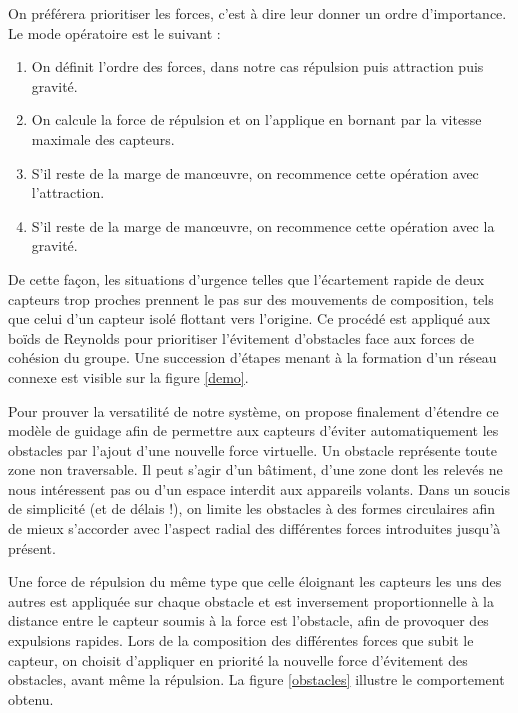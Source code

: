 \documentclass[10pt]{article}
\begin{document}
\begin{multicols}{2}
On préférera prioritiser les forces, c'est à dire leur donner un ordre
d'importance. Le mode opératoire est le suivant :

\begin{enumerate}
\item{On définit l'ordre des forces, dans notre cas répulsion puis
  attraction puis gravité.}
\item{On calcule la force de répulsion et on l'applique en bornant par
  la vitesse maximale des capteurs.}
\item{S'il reste de la marge de man\oe uvre, on recommence cette
  opération avec l'attraction.}
\item{S'il reste de la marge de man\oe uvre, on recommence cette
  opération avec la gravité.}
\end{enumerate}

De cette façon, les situations d'urgence telles que l'écartement
rapide de deux capteurs trop proches prennent le pas sur des
mouvements de composition, tels que celui d'un capteur isolé flottant
vers l'origine. Ce procédé est appliqué aux boïds de Reynolds pour
prioritiser l'évitement d'obstacles face aux forces de cohésion du
groupe. Une succession d'étapes menant à la formation d'un réseau
connexe est visible sur la figure \ref{demo}.

Pour prouver la versatilité de notre système, on propose finalement
d'étendre ce modèle de guidage afin de permettre aux capteurs d'éviter
automatiquement les obstacles par l'ajout d'une nouvelle force
virtuelle. Un obstacle représente toute zone non traversable. Il peut
s'agir d'un bâtiment, d'une zone dont les relevés ne nous intéressent
pas ou d'un espace interdit aux appareils volants. Dans un soucis de
simplicité (et de délais !), on limite les obstacles à des formes
circulaires afin de mieux s'accorder avec l'aspect radial des
différentes forces introduites jusqu'à présent.

Une force de répulsion du même type que celle éloignant les capteurs
les uns des autres est appliquée sur chaque obstacle et est
inversement proportionnelle à la distance entre le capteur soumis à la
force est l'obstacle, afin de provoquer des expulsions rapides. Lors de
la composition des différentes forces que subit le capteur, on choisit
d'appliquer en priorité la nouvelle force d'évitement des obstacles,
avant même la répulsion. La figure \ref{obstacles} illustre le
comportement obtenu.

\begin{figure}[H]


\end{figure}
\end{multicols}
\end{document}
